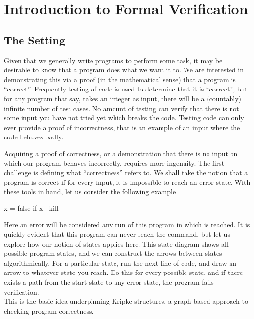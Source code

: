 
\chapter{Introduction to Formal Verification}
\section{The Setting}

Given that we generally write programs to perform some task, it may be desirable to know that a program does what we want it to.
We are interested in demonstrating this via a proof (in the mathematical sense) that a program is ``correct''.
Frequently testing of code is used to determine that it is ``correct'', but for any program that say, takes an integer as input, there will be a (countably) infinite number of test cases.
No amount of testing can verify that there is not some input you have not tried yet which breaks the code.
Testing code can only ever provide a proof of incorrectness, that is an example of an input where the code behaves badly.

Acquiring a proof of correctness, or a demonstration that there is no input on which our program behaves incorrectly, requires more ingenuity.
The first challenge is defining what ``correctness'' refers to. 
We shall take the notion that a program is correct if for every input, it is impossible to reach an error state.
With these tools in hand, let us consider the following example
\begin{code}
x = false 
if x :
  kill
\end{code}
Here an error will be considered any run of this program in which \kil is reached. 
It is quickly evident that this program can never reach the \kil command, but let us explore how our notion of states applies here.
This state diagram shows all possible program states, and we can construct the arrows between states algorithmically. 
For a particular state, run the next line of code, and draw an arrow to whatever state you reach.
Do this for every possible state, and if there exists a path from the start state to any error state, the program fails verification.\\
This is the basic idea underpinning Kripke structures, a graph-based approach to checking program correctness.

